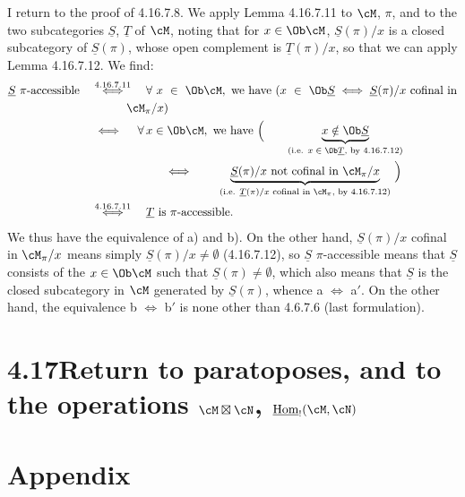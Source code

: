 \noindent I return to the proof of 4.16.7.8. We apply Lemma 4.16.7.11 to $\cM$, $\pi$, and to the two
subcategories $\underline{S}$, $\underline{T}$ of $\cM$, noting that for $x\in\Ob\cM$, $\underline{S}(\pi)/x$ is a closed subcategory of $\underline{S}(\pi)$, whose open complement is $\underline{T}(\pi)/x$, so that we can apply Lemma 4.16.7.12. We find:
\[
\begin{aligned}
\underline{S}\ \pi\text{-accessible} \quad &\overset{4.16.7.11}{\iff} \quad \forall\ x\ \in\ \Ob\cM,\ \text{we have } (x\ \in\ \Ob\underline{S}\iff\underline{S}(\pi)/x \text{ cofinal in}\\
&\qquad\quad \cM_\pi/x)\\
&\iff \quad \forall\, x\in\Ob\cM,\ \text{we have } \Bigl( \qquad \underbrace{x\notin\Ob\underline{S}}_{\text{(i.e. $x\in\Ob\underline{T}$, by 4.16.7.12)}}\\
&\qquad\qquad\qquad \iff \qquad \underbrace{\underline{S}(\pi)/x \text{ not cofinal in } \cM_\pi/x}_{\text{(i.e. $\underline{T}(\pi)/x$ cofinal in $\cM_\pi$, by 4.16.7.12)}} \ \Bigr)\\
&\overset{4.16.7.11}{\iff} \quad \underline{T} \text{ is } \pi\text{-accessible.}
\end{aligned}
\]
We thus have the equivalence of a) and b). On the other hand, $\underline{S}(\pi)/x$ cofinal in $\cM_\pi/x$ means simply $\underline{S}(\pi)/x\neq\emptyset$ (4.16.7.12), so $\underline{S}$ $\pi$-accessible means that $\underline{S}$ consists of the $x\in\Ob\cM$ such that $\underline{S}(\pi)\neq\emptyset$, which also means that $\underline{S}$ is the closed subcategory in $\cM$ generated by $\underline{S}(\pi)$, whence a $\iff$ a$'$. On the other hand, the equivalence b $\iff$ b$'$ is none other than 4.6.7.6 (last formulation). %


\section*{4.17\quad Return to paratoposes, and to the operations $\cM\boxtimes\cN$, $\underline{\operatorname{Hom}}_{!}(\cM,\cN)$}

\noindent



\section*{Appendix}

